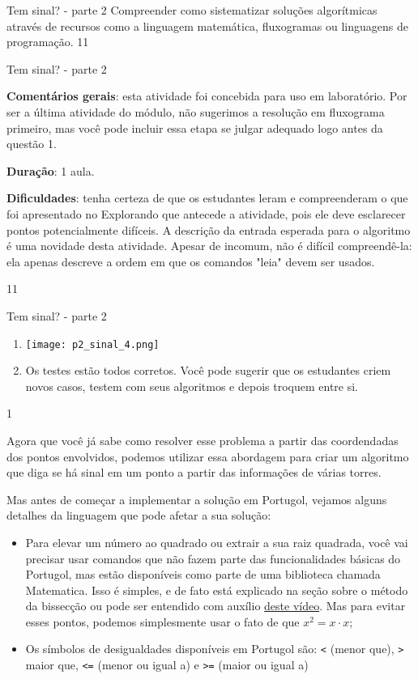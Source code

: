 \label{comp-exp11}
\begin{objectives}{Tem sinal? - parte 2}
{
Compreender como sistematizar soluções algorítmicas através de recursos como a linguagem matemática, fluxogramas ou linguagens de programação.
}{1}{1}
\end{objectives}
\begin{sugestions}{Tem sinal? - parte 2}
{
\textbf{Comentários gerais}: esta atividade foi concebida para uso em laboratório. Por ser a última atividade do módulo, não sugerimos a resolução em fluxograma primeiro, mas você pode incluir essa etapa se julgar adequado logo antes da questão 1.

\textbf{Duração}: 1 aula.

\textbf{Dificuldades}: tenha certeza de que os estudantes leram e compreenderam o que foi apresentado no Explorando que antecede a atividade, pois ele deve esclarecer pontos potencialmente difíceis. A descrição da entrada esperada para o algoritmo é uma novidade desta atividade. Apesar de incomum, não é difícil compreendê-la: ela apenas descreve a ordem em que os comandos "leia"{} devem ser usados.
}{1}{1}
\end{sugestions}
\begin{answer}{Tem sinal? - parte 2}
{

\begin{enumerate}
\item {}
{
\texttt{[image: p2\_sinal\_4.png]}
}

\item Os testes estão todos corretos. Você pode sugerir que os estudantes criem novos casos, testem com seus algoritmos e depois troquem entre si.
\end{enumerate}
}{1}
\end{answer}

Agora que você já sabe como resolver esse problema a partir das coordendadas dos pontos envolvidos, podemos utilizar essa abordagem para criar um algoritmo que diga se há sinal em um ponto a partir das informações de várias torres.

Mas antes de começar a implementar a solução em Portugol, vejamos alguns detalhes da linguagem que pode afetar a sua solução:

\begin{itemize}
\item Para elevar um número ao quadrado ou extrair a sua raiz quadrada, você vai precisar usar comandos que não fazem parte das funcionalidades básicas do Portugol, mas estão disponíveis como parte de uma biblioteca chamada Matematica. Isso é simples, e de fato está explicado na seção sobre o método da bissecção ou pode ser entendido com auxílio \href{https://www.youtube.com/watch?v=rs8ihN08bgU&feature=youtu.be}{deste vídeo}. Mas para evitar esses pontos, podemos simplesmente usar o fato de que $x^2 = x \cdot x$;
\item Os símbolos de desigualdades disponíveis em Portugol são: \verb|<| (menor que), \verb|>| maior que, \verb|<=| (menor ou igual a) e \verb|>=| (maior ou igual a)
\end{itemize}

